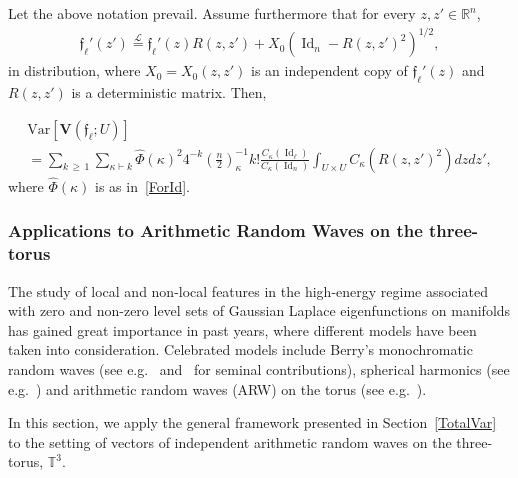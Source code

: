 \documentclass[10pt]{amsart}
\theoremstyle{definition}\newtheorem{defi}[theo]{Definition}\newtheorem{rema}[theo]{Remark}\newtheorem{exam}[theo]{Example}\newtheorem{exem}[theo]{Example}\newtheorem{nota}[theo]{Notation}
\DeclareMathOperator{\Id}{Id}
\newcommand{\bfv}{\mathbf{V}}
\newcommand{\frkf}{\mathfrak{f}}
\newcommand{\R}{\mathbb{R}}
\newcommand{\T}{\mathbb{T}^3}
\newcommand{\V}[1]{\mathrm{Var}{\left[#1\right]}}
\newcommand{\eqLaw}{ \overset{\mathcal{L}}{=} }
\begin{document}
\begin{prop}\label{VarTV}
Let the above notation prevail. Assume furthermore that for every $z,z'\in \R^n$,
\begin{gather}\label{CovMatrix}
\frkf_{\ell}'(z') \eqLaw\frkf_{\ell}'(z)R(z,z')+X_0\left(\Id_n-R(z,z')^2\right)^{1/2},
\end{gather}
in distribution, where $X_0=X_0(z,z')$ is an independent copy of $\frkf_{\ell}'(z)$ and $R(z,z') $ is a deterministic matrix. Then,

\begin{multline}\label{VarV}
\V{\bfv\left(\frkf_{\ell};U\right)} \\
= \sum_{k\,\geq\,1}\sum_{\kappa\vdash k} \widehat{\Phi}(\kappa)^2 4^{-k}\left(\frac{n}{2}\right)_{\kappa}^{-1} k !
\frac{C_{\kappa}(\Id_{\ell})}{C_{\kappa}(\Id_n)} \int_{U\times U} C_{\kappa}\left(R(z,z')^2\right) dz dz',
\end{multline}
where $\widehat{\Phi}(\kappa)$ is as in~\eqref{ForId}.
\end{prop}

\subsubsection{Applications to Arithmetic Random Waves on the three-torus}\label{SecARW}

The study of local and non-local features in the high-energy regime associated with zero and non-zero level sets of Gaussian Laplace eigenfunctions on manifolds has gained great importance in past years, where different models have been taken into consideration. Celebrated models include Berry's monochromatic random waves (see e.g.~\cite{DEL19,MPRW16,NPR17,PV20} and~\cite{Ber77,Ber02} for seminal contributions), spherical harmonics (see e.g.~\cite{CMW16b,CMW16,MP11,MRW17,Wig10}) and arithmetic random waves (ARW) on the torus (see e.g.~\cite{BM17,Cam17,
DNPR16,KKW13,
Not20,ORW08,PR16,RW08}).

In this section, we apply the general framework presented in Section~\ref{TotalVar} to the setting of vectors of independent arithmetic random waves on the three-torus, $\T$.

\end{document}
